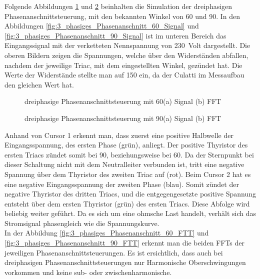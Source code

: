 Folgende Abbildungen \ref{fig:dreiphasige_Phasenanschnittsteuerung_mit_60} und \ref{fig:dreiphasige_Phasenanschnittsteuerung_mit_90} beinhalten die Simulation der dreiphasigen Phasenanschnittsteuerung, mit den bekannten Winkel von 60\textdegree\hspace{0.02cm} und 90\textdegree\hspace{0.02cm}.
In den Abbildungen \ref{fig:3_phasiges_Phasenanschnitt_60_Signal} und \ref{fig:3_phasiges_Phasenanschnitt_90_Signal} ist im  unteren Bereich das Eingangssignal mit der verketteten Nennspannung von \SI{230}{Volt} dargestellt. Die oberen Bildern zeigen die Spannungen, welche über den Widerständen abfallen, nachdem der jeweilige Triac, mit dem eingestellten Winkel, gezündet hat. Die Werte der Widerstände stellte man auf \SI{150}{\Omega} ein, da der Culatti im Messaufbau den gleichen Wert hat. 

\begin{figure}[ht!]
	\centering
	\qquad
	\caption{dreiphasige Phasenanschnittsteuerung mit 60\textdegree (a) Signal (b) FFT}
	\label{fig:dreiphasige_Phasenanschnittsteuerung_mit_60}
\end{figure}


\begin{figure}[ht!]
	\centering
	\qquad
	\caption{dreiphasige Phasenanschnittsteuerung mit 90\textdegree (a) Signal (b) FFT}
	\label{fig:dreiphasige_Phasenanschnittsteuerung_mit_90}
\end{figure}
Anhand von Cursor 1 erkennt man, dass zuerst eine positive Halbwelle der Eingangsspannung, des ersten Phase (grün), anliegt. Der positive Thyristor des ersten Triacs zündet somit bei 90\textdegree\hspace{0.02cm}, beziehungsweise bei 60\textdegree\hspace{0.02cm}. Da der Sternpunkt bei dieser Schaltung nicht mit dem Neutralleiter verbunden ist, tritt eine negative Spannung über dem Thyristor des zweiten Triac auf (rot). Beim Cursor 2 hat es eine negative Eingangsspannung der zweiten Phase (blau). Somit zündet der negative Thyristor des dritten Triacs, und die entgegengesetzte positive Spannung entsteht über dem ersten Thyristor (grün) des ersten Triacs. Diese Abfolge wird beliebig weiter geführt. Da es sich um eine ohmsche Last handelt, verhält sich das Stromsignal phasengleich wie die Spannungskurve.\\
In der Abbildung \ref{fig:3_phasiges_Phasenanschnitt_60_FTT} und \ref{fig:3_phasiges_Phasenanschnitt_90_FTT} erkennt man die beiden  FFTs der jeweiligen Phasenanschnittsteuerungen. Es ist ersichtlich, dass auch bei dreiphasigen Phasenanschnittsteuerungen nur Harmonische Oberschwingungen vorkommen und keine sub- oder zwischenharmonische. 

